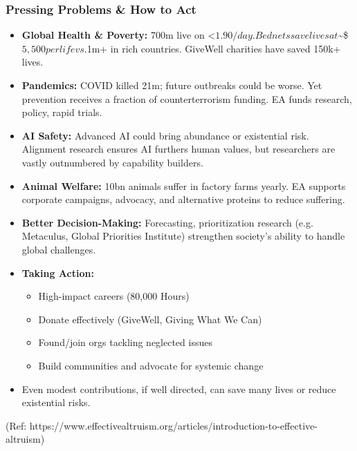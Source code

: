 \begin{frame}[fragile]\frametitle{Pressing Problems \& How to Act}
  \begin{itemize}
    \item \textbf{Global Health \& Poverty:} 700m live on <$1.90/day. Bednets save lives at $\sim\$$5,500 per life vs. $1m+ in rich countries. GiveWell charities have saved 150k+ lives.
    \item \textbf{Pandemics:} COVID killed 21m; future outbreaks could be worse. Yet prevention receives a fraction of counterterrorism funding. EA funds research, policy, rapid trials.
    \item \textbf{AI Safety:} Advanced AI could bring abundance or existential risk. Alignment research ensures AI furthers human values, but researchers are vastly outnumbered by capability builders.
    \item \textbf{Animal Welfare:} 10bn animals suffer in factory farms yearly. EA supports corporate campaigns, advocacy, and alternative proteins to reduce suffering.
    \item \textbf{Better Decision-Making:} Forecasting, prioritization research (e.g. Metaculus, Global Priorities Institute) strengthen society’s ability to handle global challenges.
    \item \textbf{Taking Action:} 
      \begin{itemize}
        \item High-impact careers (80,000 Hours)
        \item Donate effectively (GiveWell, Giving What We Can)
        \item Found/join orgs tackling neglected issues
        \item Build communities and advocate for systemic change
      \end{itemize}
    \item Even modest contributions, if well directed, can save many lives or reduce existential risks.
  \end{itemize}
  
{\tiny (Ref: https://www.effectivealtruism.org/articles/introduction-to-effective-altruism)}  	  
  
\end{frame}

